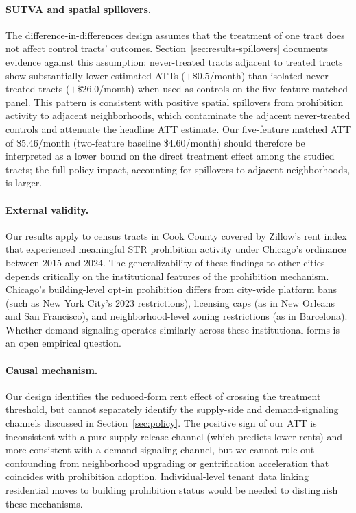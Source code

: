 \paragraph{SUTVA and spatial spillovers.} The difference-in-differences design assumes that the treatment of one tract does not affect control tracts' outcomes. Section~\ref{sec:results-spillovers} documents evidence against this assumption: never-treated tracts adjacent to treated tracts show substantially lower estimated ATTs ($+\$0.5$/month) than isolated never-treated tracts ($+\$26.0$/month) when used as controls on the five-feature matched panel. This pattern is consistent with positive spatial spillovers from prohibition activity to adjacent neighborhoods, which contaminate the adjacent never-treated controls and attenuate the headline ATT estimate. Our five-feature matched ATT of \$5.46/month (two-feature baseline \$4.60/month) should therefore be interpreted as a lower bound on the direct treatment effect among the studied tracts; the full policy impact, accounting for spillovers to adjacent neighborhoods, is larger.

\paragraph{External validity.} Our results apply to census tracts in Cook County covered by Zillow's rent index that experienced meaningful STR prohibition activity under Chicago's ordinance between 2015 and 2024. The generalizability of these findings to other cities depends critically on the institutional features of the prohibition mechanism. Chicago's building-level opt-in prohibition differs from city-wide platform bans (such as New York City's 2023 restrictions), licensing caps (as in New Orleans and San Francisco), and neighborhood-level zoning restrictions (as in Barcelona). Whether demand-signaling operates similarly across these institutional forms is an open empirical question.

\paragraph{Causal mechanism.} Our design identifies the reduced-form rent effect of crossing the treatment threshold, but cannot separately identify the supply-side and demand-signaling channels discussed in Section~\ref{sec:policy}. The positive sign of our ATT is inconsistent with a pure supply-release channel (which predicts lower rents) and more consistent with a demand-signaling channel, but we cannot rule out confounding from neighborhood upgrading or gentrification acceleration that coincides with prohibition adoption. Individual-level tenant data linking residential moves to building prohibition status would be needed to distinguish these mechanisms.

